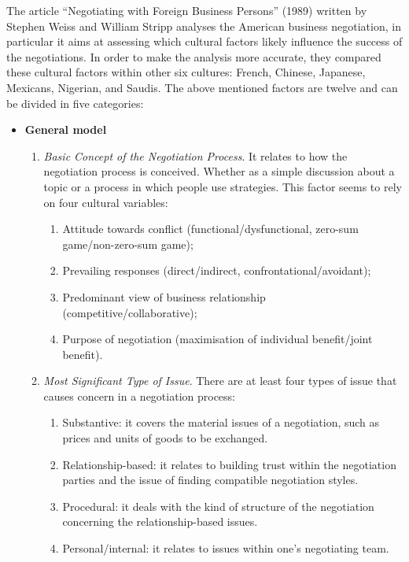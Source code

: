 \documentclass[../main.tex]{subfiles}
\begin{document}
The article “Negotiating with Foreign Business Persons” (1989) written by Stephen Weiss and William Stripp \cite{stripp} analyses the American business negotiation, in particular it aims at assessing which cultural factors likely influence the success of the negotiations. In order to make the analysis more accurate, they compared these cultural factors within other six cultures: French, Chinese, Japanese, Mexicans, Nigerian, and Saudis. The above mentioned factors are twelve and can be divided in five categories:
\begin{itemize}
    \item \textbf{General model}
    \begin{enumerate}
        \item \textit{Basic Concept of the Negotiation Process}. It relates to how the negotiation process is conceived. Whether as a simple discussion about a topic or a process in which people use strategies. This factor seems to rely on four cultural variables:
        \begin{enumerate}
            \item Attitude towards conflict (functional/dysfunctional, zero-sum game/non-zero-sum game); 
            \item Prevailing responses (direct/indirect, confrontational/avoidant);
            \item Predominant view of business relationship (competitive/collaborative);
            \item Purpose of negotiation (maximisation of individual benefit/joint benefit).
        \end{enumerate}
        
        \item \textit{Most Significant Type of Issue}. There are at least four types of issue that causes concern in a negotiation process:
        \begin{enumerate}
            \item Substantive: it covers the material issues of a negotiation, such as prices and units of goods to be exchanged.
            \item Relationship-based: it relates to building trust within the negotiation parties and the issue of finding compatible negotiation styles.
            \item Procedural: it deals with the kind of structure of the negotiation concerning the relationship-based issues.
            \item Personal/internal: it relates to issues within one's negotiating team.
        \end{enumerate}
        

\end{enumerate}
\end{itemize}
\end{document}
